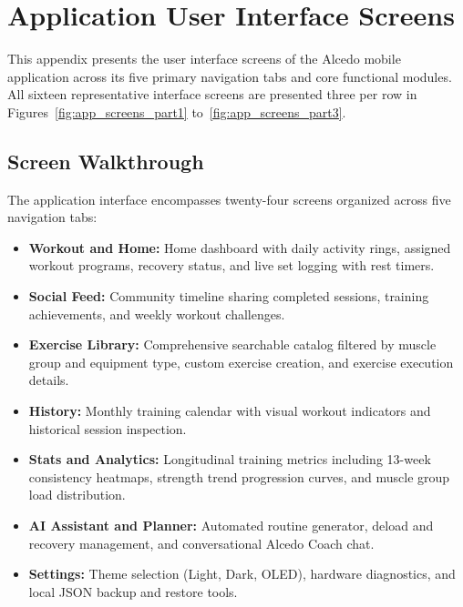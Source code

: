 %
\chapter{Application User Interface Screens}
\label{app:screenshots}

This appendix presents the user interface screens of the Alcedo mobile application across its five primary navigation tabs and core functional modules. All sixteen representative interface screens are presented three per row in Figures~\ref{fig:app_screens_part1} to~\ref{fig:app_screens_part3}.

\section{Screen Walkthrough}
The application interface encompasses twenty-four screens organized across five navigation tabs:
\begin{itemize}
    \item \textbf{Workout and Home:} Home dashboard with daily activity rings, assigned workout programs, recovery status, and live set logging with rest timers.
    \item \textbf{Social Feed:} Community timeline sharing completed sessions, training achievements, and weekly workout challenges.
    \item \textbf{Exercise Library:} Comprehensive searchable catalog filtered by muscle group and equipment type, custom exercise creation, and exercise execution details.
    \item \textbf{History:} Monthly training calendar with visual workout indicators and historical session inspection.
    \item \textbf{Stats and Analytics:} Longitudinal training metrics including 13-week consistency heatmaps, strength trend progression curves, and muscle group load distribution.
    \item \textbf{AI Assistant and Planner:} Automated routine generator, deload and recovery management, and conversational Alcedo Coach chat.
    \item \textbf{Settings:} Theme selection (Light, Dark, OLED), hardware diagnostics, and local JSON backup and restore tools.
\end{itemize}

